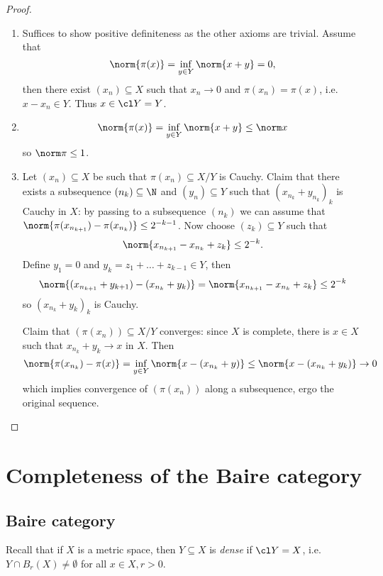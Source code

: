 \documentclass[a4paper]{article}
\begin{document}
\begin{proof}\leavevmode
  \begin{enumerate}
  \item Suffices to show positive definiteness as the other axioms are trivial. Assume that
    \[
      \norm{\pi(x)} = \inf_{y \in Y} \norm{x + y} = 0,
    \]
    then there exist \((x_n) \subseteq X\) such that \(x_n \to 0\) and \(\pi(x_n) = \pi(x)\), i.e.\ \(x - x_n \in Y\). Thus \(x \in \cl Y = Y\).
  \item
    \[
      \norm{\pi(x)} = \inf_{y \in Y} \norm{x + y} \leq \norm x
    \]
    so \(\norm \pi \leq 1\).
  \item Let \((x_n) \subseteq X\) be such that \(\pi(x_n) \subseteq X / Y\) is Cauchy. Claim that there exists a subsequence \((n_k) \subseteq \N\) and \((y_n) \subseteq Y\) such that \((x_{n_k} + y_{n_k})_k\) is Cauchy in \(X\): by passing to a subsequence \((n_k)\) we can assume that \(\norm{\pi(x_{n_{k + 1}}) - \pi(x_{n_k})} \leq 2^{-k - 1}\). Now choose \((z_k) \subseteq Y\) such that
    \[
      \norm{x_{n_{k + 1}} - x_{n_k} + z_k} \leq 2^{-k}.
    \]
    Define \(y_1 = 0\) and \(y_k = z_1 + \dots + z_{k - 1} \in Y\), then
    \[
      \norm{(x_{n_{k + 1}} + y_{k + 1}) - (x_{n_k} + y_k)}
      = \norm{x_{n_{k + 1}} - x_{n_k} + z_k}
        \leq 2^{-k}
    \]
    so \((x_{n_k} + y_k)_k\) is Cauchy.

    Claim that \((\pi(x_n)) \subseteq X / Y\) converges: since \(X\) is complete, there is \(x \in X\) such that \(x_{n_k} + y_k \to x\) in \(X\). Then
    \[
      \norm{\pi(x_{n_k}) - \pi(x)}
      = \inf_{y \in Y} \norm{x - (x_{n_k} + y)}
      \leq \norm{x - (x_{n_k} + y_k)}
      \to 0
    \]
    which implies convergence of \((\pi(x_n))\) along a subsequence, ergo the original sequence.
  \end{enumerate}
\end{proof}

\section{Completeness of the Baire category}

\subsection{Baire category}

Recall that if \(X\) is a metric space, then \(Y \subseteq X\) is \emph{dense} if \(\cl Y = X\), i.e.\ \(Y \cap B_r(X) \neq \emptyset\) for all \(x \in X, r > 0\).
\end{document}
